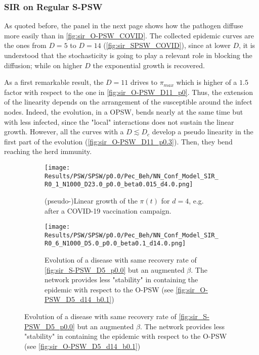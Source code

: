 \documentclass[a4paper,10pt,twoside]{book} %
\theoremstyle{definition}
\begin{document}
\subsubsection*{SIR on Regular S-PSW}
As quoted before, the panel in the next page shows how the pathogen diffuse more easily than in \autoref{fig:sir_O-PSW_COVID}. The collected epidemic curves are the ones from $D = 5$ to $D = 14$ (\autoref{fig:sir_SPSW_COVID}), since at lower $D$, it is understood that the stochasticity is going to play a relevant role in blocking the diffusion; while on higher $D$ the exponential growth is recovered.

As a first remarkable result, the $ D = 11$ drives to $ \pi_{max}$ which is higher of a $ 1.5$ factor with respect to the one in \autoref{fig:sir_O-PSW_D11_p0}. Thus, the extension of the linearity depends on the arrangement of the susceptible around the infect nodes. Indeed, the evolution, in a OPSW, bends nearly at the same time but with less infected, since the "local" interactions does not sustain the linear growth. However, all the curves with a $D \lesssim D_c$ develop a pseudo linearity in the first part of the evolution (\autoref{fig:sir_O-PSW_D11_p0.3}). Then, they bend reaching the herd immunity.

\begin{figure}[H]
	\centering
	\begin{subfigure}{0.8\linewidth}
		\texttt{[image: Results/PSW/SPSW/p0.0/Pec\_Beh/NN\_Conf\_Model\_SIR\_R0\_1\_N1000\_D23.0\_p0.0\_beta0.015\_d4.0.png]}
		\caption{(pseudo-)Linear growth of the $\pi(t)$ for $d = 4$, e.g. after a COVID-19 vaccination campaign.}
		\label{fig:sir_SPSW_D23_beta0.015_d4}
	\end{subfigure}
	\par\medskip
	\begin{subfigure}{0.8\linewidth}
		\texttt{[image: Results/PSW/SPSW/p0.0/Pec\_Beh/NN\_Conf\_Model\_SIR\_R0\_6\_N1000\_D5.0\_p0.0\_beta0.1\_d14.0.png]}
		\caption{Evolution of a disease with same recovery rate of \autoref{fig:sir_S-PSW_D5_p0.0} but an augmented $\beta$. The network provides less "stability" in containing the epidemic with respect to the O-PSW (see \autoref{fig:sir_O-PSW_D5_d14_b0.1})}
		\label{fig:SPSW_b0.015_d14}
	\end{subfigure}
\end{figure}
\end{document}
